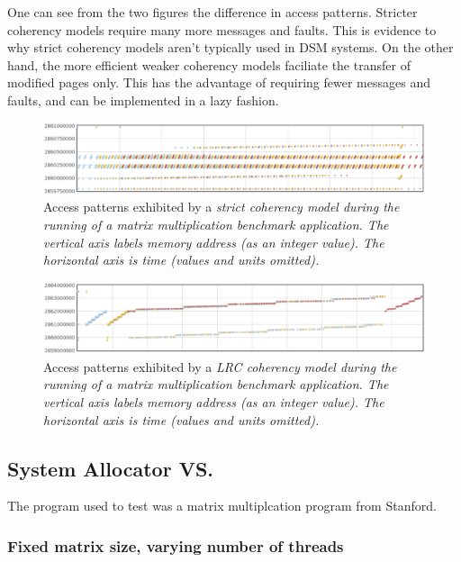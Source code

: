 One can see from the two figures the difference in access patterns.  Stricter coherency models require many more messages and faults.  This is evidence to why strict coherency models aren't typically used in DSM systems.  On the other hand, the more efficient weaker coherency models faciliate the transfer of modified pages only.  This has the advantage of requiring fewer messages and faults, and can be implemented in a lazy fashion.

\begin{figure}[t]
\centering
\includegraphics[scale=0.40]{images/access-patterns-strict.eps}
\caption{Access patterns exhibited by a \em strict \em coherency model during the running of a matrix multiplication benchmark application.  The vertical axis labels memory address (as an integer value).  The horizontal axis is time (values and units omitted).}
\label{access-patters-strict}
\end{figure}

\begin{figure}[t]
\centering
\includegraphics[scale=0.40]{images/access-patterns-rc.eps}
\caption{Access patterns exhibited by a \em LRC \em coherency model during the running of a matrix multiplication benchmark application.  The vertical axis labels memory address (as an integer value).  The horizontal axis is time (values and units omitted).}
\label{access-patters-rc}
\end{figure}



\subsection{System Allocator VS. \projname{}}

The program used to test was a matrix multiplcation program from Stanford.

\subsubsection{Fixed matrix size, varying number of threads}

